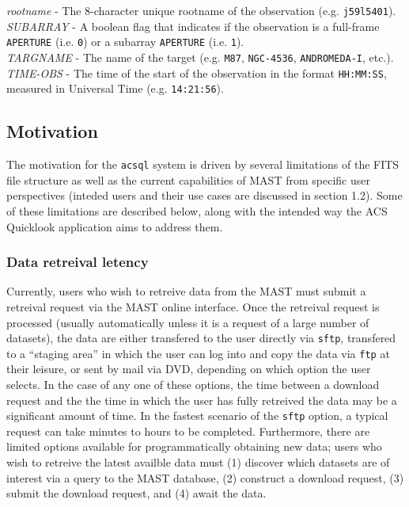 \documentclass[10pt,journal,compsoc]{IEEEtran}
\begin{document}
\textit{rootname} - The 8-character unique rootname of the observation (e.g. \texttt{j59l5401}).\\

\textit{SUBARRAY} - A boolean flag that indicates if the observation is a full-frame \texttt{APERTURE}
(i.e. \texttt{0}) or a subarray \texttt{APERTURE} (i.e. \texttt{1}).\\

\textit{TARGNAME} - The name of the target (e.g. \texttt{M87}, \texttt{NGC-4536}, \texttt{ANDROMEDA-I}, etc.).\\

\textit{TIME-OBS} - The time of the start of the observation in the format \texttt{HH:MM:SS}, measured in
Universal Time (e.g. \texttt{14:21:56}).\\


\subsection{Motivation}

The motivation for the \texttt{acsql} system is driven by several limitations
of the FITS file structure as well as the current capabilities of MAST from specific
user perspectives (inteded users and their use cases are discussed in section 1.2).
Some of these limitations are described below, along with the intended way the
ACS Quicklook application aims to address them.\newline

\subsubsection{Data retreival letency}

Currently, users who wish to retreive data from the MAST must submit a retreival
request via the MAST online interface. Once the retreival request is processed
(usually automatically unless it is a request of a large number of datasets),
the data are either transfered to the user directly via \texttt{sftp}, transfered
to a ``staging area'' in which the user can log into and copy the data via
\texttt{ftp} at their leisure, or sent by mail via DVD, depending on which option
the user selects.  In the case of any one of these options, the time between a
download request and the the time in which the user has fully retreived the data
may be a significant amount of time.  In the fastest scenario of the
\texttt{sftp} option, a typical request can take minutes to hours to be completed.
Furthermore, there are limited options available for programmatically obtaining new
data; users who wish to retreive the latest availble data must (1) discover which
datasets are of interest via a query to the MAST database, (2) construct a download
request, (3) submit the download request, and (4) await the data.
\end{document}
